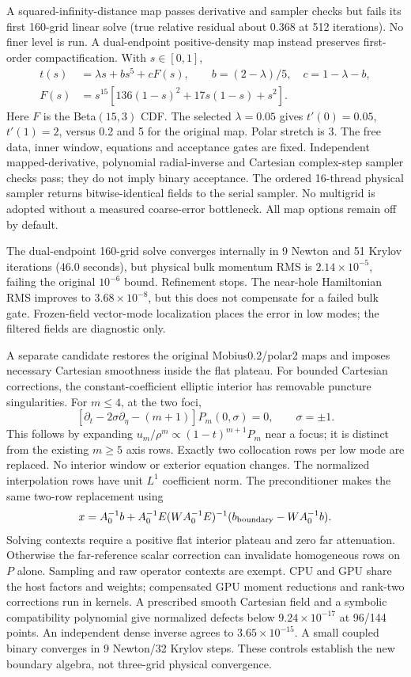 \documentclass[aps,prd,preprint,notitlepage,nofootinbib]{revtex4-2}
\begin{document}
A squared-infinity-distance map passes derivative and sampler checks but
fails its first 160-grid linear solve (true relative residual about 0.368
at 512 iterations). No finer level is run. A dual-endpoint positive-density
map instead preserves first-order compactification. With $s\in[0,1]$,
\begin{align*}
 t(s)&=\lambda s+b s^5+c F(s),\qquad
 b=(2-\lambda)/5,\quad c=1-\lambda-b,\\
 F(s)&=s^{15}[136(1-s)^2+17s(1-s)+s^2].
\end{align*}
Here $F$ is the Beta$(15,3)$ CDF. The selected $\lambda=0.05$ gives
$t'(0)=0.05$, $t'(1)=2$, versus 0.2 and 5 for the original map. Polar stretch
is 3. The free data, inner window, equations and acceptance gates are fixed.
Independent mapped-derivative, polynomial radial-inverse and Cartesian
complex-step sampler checks pass; they do not imply binary acceptance.
The ordered 16-thread physical sampler returns bitwise-identical fields to
the serial sampler. No multigrid is adopted without a measured coarse-error
bottleneck. All map options remain off by default.

The dual-endpoint 160-grid solve converges internally in 9 Newton and 51
Krylov iterations (46.0 seconds), but physical bulk momentum RMS is
$2.14\times10^{-5}$, failing the original $10^{-6}$ bound. Refinement stops.
The near-hole Hamiltonian RMS improves to $3.68\times10^{-8}$, but this does
not compensate for a failed bulk gate. Frozen-field vector-mode localization
places the error in low modes; the filtered fields are diagnostic only.

A separate candidate restores the original Mobius0.2/polar2 maps and imposes
necessary Cartesian smoothness inside the flat plateau. For bounded
Cartesian corrections, the constant-coefficient elliptic interior has
removable puncture singularities. For $m\le4$, at the two foci,
\[
 [\partial_t-2\sigma\partial_\eta-(m+1)]P_m(0,\sigma)=0,
 \qquad\sigma=\pm1.
\]
This follows by expanding $u_m/\rho^m\propto(1-t)^{m+1}P_m$ near a focus;
it is distinct from the existing $m\ge5$ axis rows. Exactly two collocation
rows per low mode are replaced. No interior window or exterior equation
changes. The normalized interpolation rows have unit $L^1$ coefficient norm.
The preconditioner makes the same two-row replacement using
\[
 x=A_0^{-1}b+A_0^{-1}E(WA_0^{-1}E)^{-1}
       (b_{\rm boundary}-WA_0^{-1}b).
\]
Solving contexts require a positive flat interior plateau and zero far
attenuation. Otherwise the far-reference scalar correction can invalidate
homogeneous rows on $P$ alone. Sampling and raw operator contexts are exempt.
CPU and GPU share the host factors and weights; compensated GPU moment reductions and
rank-two corrections run in kernels. A prescribed smooth Cartesian field
and a symbolic compatibility polynomial give normalized defects below
$9.24\times10^{-17}$ at 96/144 points. An independent dense inverse agrees
to $3.65\times10^{-15}$. A small coupled binary converges in 9 Newton/32
Krylov steps. These controls establish the new boundary algebra, not
three-grid physical convergence.
\end{document}
